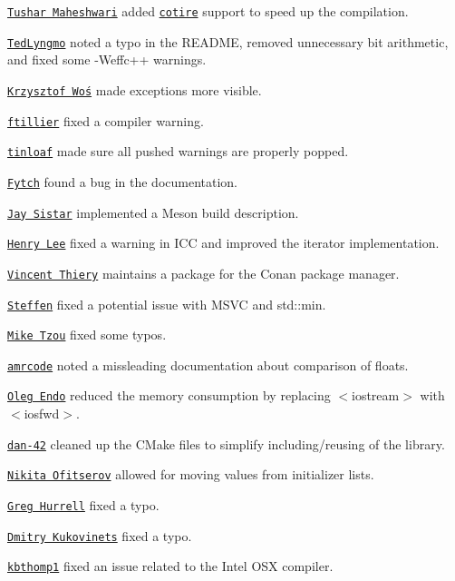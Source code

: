 \begin{DoxyItemize}
\item \href{https://github.com/tusharpm}{\tt Tushar Maheshwari} added \href{https://github.com/sakra/cotire}{\tt cotire} support to speed up the compilation.
\item \href{https://github.com/TedLyngmo}{\tt Ted\+Lyngmo} noted a typo in the R\+E\+A\+D\+ME, removed unnecessary bit arithmetic, and fixed some {\ttfamily -\/\+Weffc++} warnings.
\item \href{https://github.com/krzysztofwos}{\tt Krzysztof Woś} made exceptions more visible.
\item \href{https://github.com/ftillier}{\tt ftillier} fixed a compiler warning.
\item \href{https://github.com/tinloaf}{\tt tinloaf} made sure all pushed warnings are properly popped.
\item \href{https://github.com/Fytch}{\tt Fytch} found a bug in the documentation.
\item \href{https://github.com/Type1J}{\tt Jay Sistar} implemented a Meson build description.
\item \href{https://github.com/HenryRLee}{\tt Henry Lee} fixed a warning in I\+CC and improved the iterator implementation.
\item \href{https://github.com/vthiery}{\tt Vincent Thiery} maintains a package for the Conan package manager.
\item \href{https://github.com/koemeet}{\tt Steffen} fixed a potential issue with M\+S\+VC and {\ttfamily std\+::min}.
\item \href{https://github.com/Chocobo1}{\tt Mike Tzou} fixed some typos.
\item \href{https://github.com/amrcode}{\tt amrcode} noted a missleading documentation about comparison of floats.
\item \href{https://github.com/olegendo}{\tt Oleg Endo} reduced the memory consumption by replacing {\ttfamily $<$iostream$>$} with {\ttfamily $<$iosfwd$>$}.
\item \href{https://github.com/dan-42}{\tt dan-\/42} cleaned up the C\+Make files to simplify including/reusing of the library.
\item \href{https://github.com/himikof}{\tt Nikita Ofitserov} allowed for moving values from initializer lists.
\item \href{https://github.com/wincent}{\tt Greg Hurrell} fixed a typo.
\item \href{https://github.com/DmitryKuk}{\tt Dmitry Kukovinets} fixed a typo.
\item \href{https://github.com/kbthomp1}{\tt kbthomp1} fixed an issue related to the Intel O\+SX compiler.

\end{DoxyItemize}
